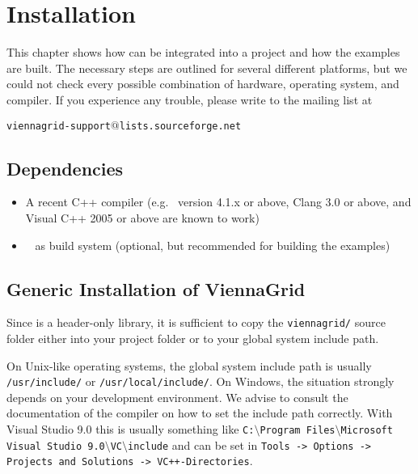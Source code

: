 \chapter{Installation}

This chapter shows how {\ViennaGrid} can be integrated into a project and how
the examples are built. The necessary steps are outlined for several different
platforms, but we could not check every possible combination of hardware,
operating system, and compiler. If you experience any trouble, please write to
the mailing list at \\
\begin{center}
\texttt{viennagrid-support$@$lists.sourceforge.net}
\end{center}


\section{Dependencies}
\label{dependencies}

\begin{itemize}
 \item A recent C++ compiler (e.g.~{\GCC} version 4.1.x or above, Clang 3.0 or above, and Visual C++
2005 or above are known to work)
 \item {\CMake}~\cite{cmake} as build system (optional, but recommended
for building the examples)
\end{itemize}


\section{Generic Installation of ViennaGrid} \label{sec:viennagrid-installation}
Since {\ViennaGrid} is a header-only library, it is sufficient to copy the
\lstinline|viennagrid/| source folder either into your project folder or to your global system
include path. %

On Unix-like operating systems, the global system include path is usually \lstinline|/usr/include/| or \lstinline|/usr/local/include/|.
On Windows, the situation strongly depends on your development environment. We
advise to consult the documentation of the compiler on how to set the include
path correctly. With Visual Studio 9.0 this is usually something like
\texttt{C:$\setminus$Program Files$\setminus$Microsoft Visual Studio
9.0$\setminus$VC$\setminus$include}
and can be set in \texttt{Tools -> Options -> Projects and Solutions ->
VC++-\-Directories}.


